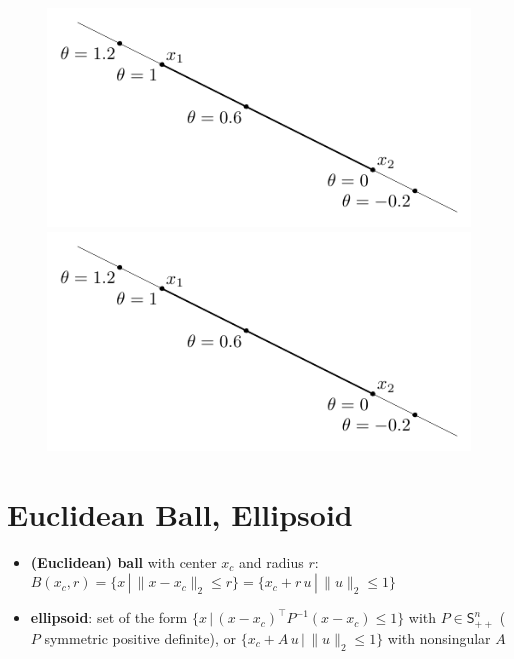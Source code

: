 \documentclass[11pt]{extarticle}
\newcommand{\ds}{\displaystyle}
\theoremstyle{definition}
\begin{document}
\begin{figure}[!htbp]
  \centering
  \includegraphics[scale=0.9,page=6]{fig/02.pdf}
  \includegraphics[scale=0.7,page=7]{fig/02.pdf}
\end{figure}

\newpage

\section*{Euclidean Ball, Ellipsoid}
\begin{itemize}
  \item {\bf (Euclidean) ball} with center $x_c$ and radius $r$: \\ $\ds B(x_c, r) = \{x\,|\,\|x - x_c\|_2\leqslant r\} = \{x_c + r\,u\,|\,\|u\|_2 \leqslant 1\}$
  \item {\bf ellipsoid}: set of the form $\ds\{x\,|\,(x - x_c)^\top P^{-1}(x - x_c)\leqslant 1\}$ with $P\in\mathsf{S}_{++}^n$ ($P$ symmetric positive definite), or $\ds\{x_c + A\,u\,|\,\|u\|_2 \leqslant 1\}$ with nonsingular $A$
\end{itemize}
\end{document}
